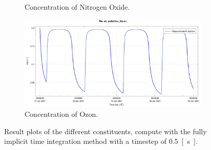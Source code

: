 \begin{figure}[H]
\begin{subfigure}{0.5\textwidth}
        \caption{Concentration of Nitrogen Oxide.}
    \end{subfigure}
    \begin{subfigure}{0.5\textwidth}
        \includegraphics[width=\textwidth]{figures/ozon_dt0d5.pdf}
        \caption{Concentration of Ozon.}
    \end{subfigure}
    \caption{Result plots of the different constituents, compute with the fully implicit time integration method with a timestep of \SI{0.5}{[\second]}.}
\end{figure}

